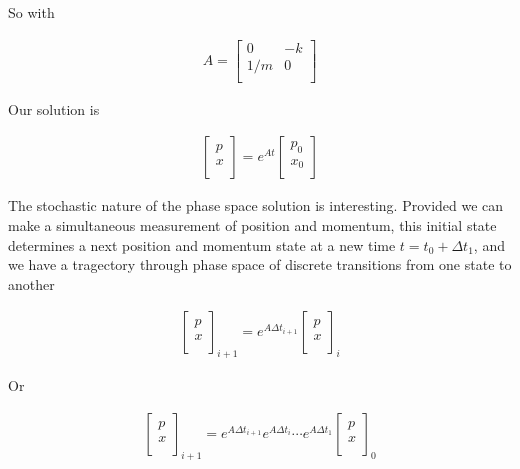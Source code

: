 So with 

\begin{align}\label{eqn:hamiltonian:woo5}
A = 
\begin{bmatrix}
0 & - k \\
1/m & 0 \\
\end{bmatrix}
\end{align}

Our solution is 

\begin{align}\label{eqn:hamiltonian:woo6}
\begin{bmatrix}
p \\
x \\
\end{bmatrix}
=
e^{At}
\begin{bmatrix}
p_0 \\
x_0 \\
\end{bmatrix}
\end{align}

The stochastic nature of the phase space solution is interesting.  Provided we can make a simultaneous measurement of position and momentum, this initial state determines a next position and momentum state at a new time $t = t_0 + \Delta t_1$, and we have a tragectory through phase space of discrete transitions from one state to another

\begin{align}\label{eqn:hamiltonian:woo6a}
{\begin{bmatrix}
p \\
x \\
\end{bmatrix}}_{i+1}
=
e^{A \Delta t_{i+1}}
{\begin{bmatrix}
p \\
x \\
\end{bmatrix}}_i
\end{align}

Or 

\begin{align}\label{eqn:hamiltonian:woo6b}
{\begin{bmatrix}
p \\
x \\
\end{bmatrix}}_{i+1}
=
e^{A \Delta t_{i+1}} e^{A \Delta t_{i}} \cdots e^{A \Delta t_1}
{\begin{bmatrix}
p \\
x \\
\end{bmatrix}}_0
\end{align}

